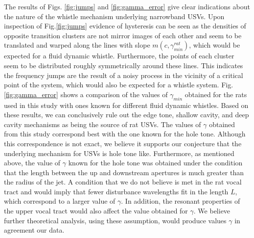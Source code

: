 \documentclass[superscriptaddress, twocolumn, prl]{revtex4}
\begin{document}
The results of Figs. \ref{fig:jumps} and \ref{fig:gamma_error} give clear indications about the nature of the whistle mechanism underlying narrowband USVs. Upon inspection of Fig.\ref{fig:jumps} evidence of hysteresis can be seen as the densities of opposite transition clusters are not mirror images of each other and seem to be translated and warped along the lines with slope $m\left(c,\gamma_{min}^{rat}\right)$, which would be expected for a fluid dynamic whistle. Furthermore, the points of each cluster seem to be distributed roughly symmetrically around these lines. This indicates the frequency jumps are the result of a noisy process in the vicinity of a critical point of the system, which would also be expected for a whistle system. Fig. \ref{fig:gamma_error} shows a comparison of the values of $\gamma_{min}$ obtained for the rats used in this study with ones known for different fluid dynamic whistles. Based on these results, we can conclusively rule out the edge tone, shallow cavity, and deep cavity mechanisms as being the source of rat USVs. The values of $\gamma$ obtained from this study correspond best with the one known for the hole tone. Although this correspondence is not exact, we believe it supports our conjecture that the underlying mechanism for USVs is hole tone like. Furthermore, as mentioned above, the value of $\gamma$ known for the hole tone was obtained under the condition that the length between the up and downstream apertures is much greater than the radius of the jet. A condition that we do not believe is met in the rat vocal tract and would imply that fewer disturbance wavelengths fit in the length $L$, which correspond to a larger value of $\gamma$. In addition, the resonant properties of the upper vocal tract would also affect the value obtained for $\gamma$. We believe further theoretical analysis, using these assumption, would produce values $\gamma$ in agreement our data.



\appendix
\end{document}
